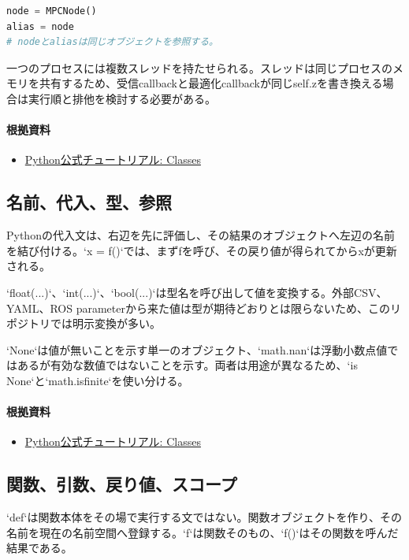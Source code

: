 \documentclass[a4paper,11pt]{article}
\begin{document}
\begin{lstlisting}[language=python]
node = MPCNode()
alias = node
# nodeとaliasは同じオブジェクトを参照する。
\end{lstlisting}


一つのプロセスには複数スレッドを持たせられる。スレッドは同じプロセスのメモリを共有するため、受信callbackと最適化callbackが同じself.zを書き換える場合は実行順と排他を検討する必要がある。

\paragraph{根拠資料}
\begin{itemize}[leftmargin=1.6em]
\item \href{https://docs.python.org/3/tutorial/classes.html}{Python公式チュートリアル: Classes}
\end{itemize}

\subsection{名前、代入、型、参照}
Pythonの代入文は、右辺を先に評価し、その結果のオブジェクトへ左辺の名前を結び付ける。`x = f()`では、まずfを呼び、その戻り値が得られてからxが更新される。


`float(...)`、`int(...)`、`bool(...)`は型名を呼び出して値を変換する。外部CSV、YAML、ROS parameterから来た値は型が期待どおりとは限らないため、このリポジトリでは明示変換が多い。


`None`は値が無いことを示す単一のオブジェクト、`math.nan`は浮動小数点値ではあるが有効な数値ではないことを示す。両者は用途が異なるため、`is None`と`math.isfinite`を使い分ける。

\paragraph{根拠資料}
\begin{itemize}[leftmargin=1.6em]
\item \href{https://docs.python.org/3/tutorial/classes.html}{Python公式チュートリアル: Classes}
\end{itemize}

\subsection{関数、引数、戻り値、スコープ}
`def`は関数本体をその場で実行する文ではない。関数オブジェクトを作り、その名前を現在の名前空間へ登録する。`f`は関数そのもの、`f()`はその関数を呼んだ結果である。
\end{document}
